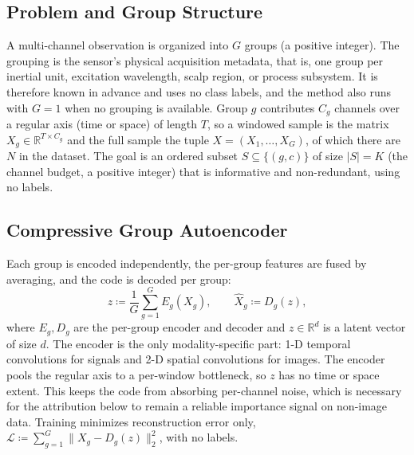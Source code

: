 \documentclass[conference]{IEEEtran}
\begin{document}
\subsection{Problem and Group Structure}
A multi-channel observation is organized into $G$ groups (a positive integer). The
grouping is the sensor's physical acquisition metadata, that is, one group per
inertial unit, excitation wavelength, scalp region, or process subsystem. It is
therefore known in advance and uses no class labels, and the method also runs with
$G{=}1$ when no grouping is available. Group $g$ contributes $C_g$ channels over a
regular axis (time or space) of length $T$, so a windowed sample is the matrix
$X_g\in\mathbb{R}^{T\times C_g}$ and the full sample the tuple $X=(X_1,\dots,X_G)$,
of which there are $N$ in the dataset. The goal is an ordered subset
$S\subseteq\{(g,c)\}$ of size $|S|=K$ (the channel budget, a positive integer) that
is informative and non-redundant, using no labels.

\subsection{Compressive Group Autoencoder}
Each group is encoded independently, the per-group features are fused by averaging,
and the code is decoded per group:
\begin{equation}
z \coloneqq \frac{1}{G}\sum_{g=1}^{G} E_g(X_g), \qquad \hat{X}_g \coloneqq D_g(z),
\end{equation}
where $E_g,D_g$ are the per-group encoder and decoder and $z\in\mathbb{R}^{d}$ is a
latent vector of size $d$. The encoder is the only modality-specific part: 1-D
temporal convolutions for signals and 2-D spatial convolutions for images. The
encoder pools the regular axis to a per-window bottleneck, so $z$ has no time or
space extent. This keeps the code from absorbing per-channel noise, which is
necessary for the attribution below to remain a reliable importance signal on
non-image data. Training minimizes reconstruction error only,
$\mathcal{L}\coloneqq\sum_{g=1}^{G}\|X_g-D_g(z)\|_2^2$, with no labels.
\end{document}
